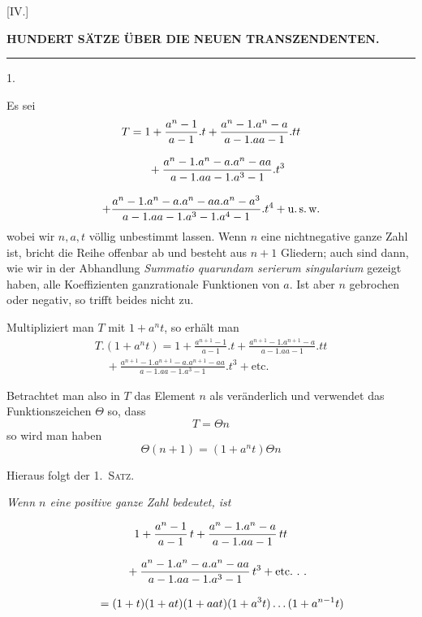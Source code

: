 \begingroup
\renewcommand{\arraystretch}{1.45}
\clearpage{}


\begin{center}
[IV.]\par
\bigskip
\textbf{HUNDERT SÄTZE ÜBER DIE NEUEN TRANSZENDENTEN.}\par
\medskip
\rule{.09\textwidth}{.3pt}\par
\bigskip
{}1.
\end{center}

Es sei
\[
\begin{gathered}
T={}1+\frac{a^n-1}{a-1}.t
+\frac{a^n-1.a^n-a}{a-1.aa-1}.tt
\\[8pt]\quad{}+\frac{a^n-1.a^n-a.a^n-aa}{a-1.aa-1.a^3-1}.t^3\\[8pt]
+\frac{a^n-1.a^n-a.a^n-aa.a^n-a^3}
{a-1.aa-1.a^3-1.a^4-1}.t^4+\text{u.\,s.\,w.}
\end{gathered}
\]
wobei wir $n,a,t$ völlig unbestimmt lassen. Wenn $n$ eine nichtnegative ganze
Zahl ist, bricht die Reihe offenbar ab und besteht aus $n+1$ Gliedern; auch sind
dann, wie wir in der Abhandlung \textit{Summatio quarundam serierum singularium} gezeigt haben, alle Koeffizienten ganzrationale Funktionen von $a$. Ist aber $n$ gebrochen oder negativ, so trifft beides nicht zu.


Multipliziert man $T$ mit $1+a^n t$, so erhält man
\[
\begin{gathered}T.(1+a^n t)=1+\frac{a^{n+1}-1}{a-1}.t
+\frac{a^{n+1}-1.a^{n+1}-a}{a-1.aa-1}.tt
\\[8pt]\quad{}+\frac{a^{n+1}-1.a^{n+1}-a.a^{n+1}-aa}{a-1.aa-1.a^3-1}.t^3
+\text{etc.}\end{gathered}
\]


Betrachtet man also in $T$ das Element $n$ als veränderlich und verwendet
das Funktionszeichen $\Theta$ so, dass
\[
T=\Theta n
\]
so wird man haben
\[
\Theta(n+1)=(1+a^n t)\Theta n
\]

Hieraus folgt der 1.\ \textsc{Satz.}




\begin{center}
\textit{Wenn $n$ eine positive ganze Zahl bedeutet, ist}
\end{center}
\[
\begin{gathered}
1+\frac{a^n-1}{a-1}\,t
 +\frac{a^n-1.a^n-a}{a-1.aa-1}\,tt
 \\[8pt]\quad{}+\frac{a^n-1.a^n-a.a^n-aa}{a-1.aa-1.a^3-1}\,t^3
 +\text{etc.}\ .\ .
\\[8pt]
\qquad=(1+t)(1+at)(1+aat)(1+a^3t)\mathinner{.\,.\,.}(1+a^{n-1}t)
\end{gathered}
\]

\clearpage
\endgroup
